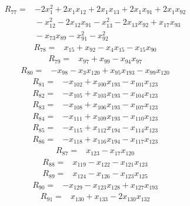 \documentclass[11pt]{article}
\theoremstyle{definition}
\theoremstyle{remark}
\begin{document}
\begin{align*}
R_{77} ={}& -2x_{1}^{2} + 2x_{1} x_{12} + 2x_{1} x_{13} + 2x_{1} x_{91} + 2x_{1} x_{92} \\
&{} -x_{12}^{2} - 2x_{12} x_{91} - x_{13}^{2} - 2x_{13} x_{92} + x_{17} x_{93} \\
&{} -x_{73} x_{89} - x_{91}^{2} - x_{92}^{2}
\end{align*}
\begin{align*}
R_{78} ={}& x_{15} + x_{92} - x_{4} x_{15} - x_{15} x_{90}
\end{align*}
\begin{align*}
R_{79} ={}& x_{97} + x_{99} - x_{94} x_{97}
\end{align*}
\begin{align*}
R_{80} ={}& -x_{98} - x_{3} x_{120} + x_{95} x_{193} - x_{99} x_{120}
\end{align*}
\begin{align*}
R_{81} ={}& -x_{102} + x_{100} x_{193} - x_{101} x_{123}
\end{align*}
\begin{align*}
R_{82} ={}& -x_{105} + x_{103} x_{193} - x_{104} x_{123}
\end{align*}
\begin{align*}
R_{83} ={}& -x_{108} + x_{106} x_{193} - x_{107} x_{123}
\end{align*}
\begin{align*}
R_{84} ={}& -x_{111} + x_{109} x_{193} - x_{110} x_{123}
\end{align*}
\begin{align*}
R_{85} ={}& -x_{115} + x_{112} x_{194} - x_{114} x_{123}
\end{align*}
\begin{align*}
R_{86} ={}& -x_{118} + x_{116} x_{194} - x_{117} x_{123}
\end{align*}
\begin{align*}
R_{87} ={}& x_{123} - x_{17} x_{120}
\end{align*}
\begin{align*}
R_{88} ={}& x_{119} - x_{122} - x_{121} x_{123}
\end{align*}
\begin{align*}
R_{89} ={}& x_{124} - x_{126} - x_{123} x_{125}
\end{align*}
\begin{align*}
R_{90} ={}& -x_{129} - x_{123} x_{128} + x_{127} x_{193}
\end{align*}
\begin{align*}
R_{91} ={}& x_{130} + x_{133} - 2x_{130} x_{132}
\end{align*}
\end{document}
